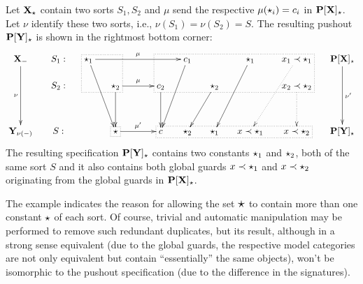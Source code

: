 \begin{example}\label{ex:sigchoice}
Let ${\bf X}_\star$ contain two sorts $S_1,S_2$ and $\mu$ send the respective
$\mu(\star_i)=c_i$ in  ${\bf P[X]_\star}$. Let $\nu$ identify these two
sorts, i.e., $\nu(S_1)=\nu(S_2)=S$. The resulting pushout ${\bf P[Y]_\star}$ is shown in the
rightmost bottom corner:
\[
\xymatrix@R=0.5cm@C=0.5cm{
\thr X_\weak  \ar[ddd]_\nu & S_1: & {\cons_1} \save[].[dr]*\frm{.}\restore \ar[dddr] \ar[rrrr]^\mu && &&
           c_1 \ar[dddl] & & \cons_1 \ar[dddl]  & x_1\prec
           \cons_1  \ar@{.>}[dddl] & \thr{P[X]_\cons} \ar[ddd]^{\nu'} \\
 & S_2: & & \cons_2 \ar[rr]^\mu \ar[dd]  && c_2 \save[].[urrrr]*\frm{.}\restore 
               \ar[dd] & & \cons_2 \ar[ddl] &  & x_2\prec
           \cons_2  \ar@{.>}[dd]\\ 
& & &&&&&&  \\
\thr{Y_{\nu(\weak)}} & S: & & \cons \save[].[]*\frm{.}\restore \ar[rr]^{\mu'} && 
    c \save[].[rrrr]*\frm{.}\restore & \cons_2 & \cons_1 &   x\prec \cons_1 &
    x\prec \cons_2 & \thr{P[Y]_\cons}
}
\]
The resulting specification  ${\bf P[Y]_\star}$ contains two constants $\star_1$ and $\star_2$,
both of the same sort $S$ and it also contains both global guards $x\prec
\star_1$ and $x\prec \star_2$ originating from the global guards in
${\bf P[X]_\star}$.
\end{example}
%
The example indicates the reason for allowing the set $\mbox{\Large{$\star$}}$ to contain more
than one constant $\star$
of each sort. Of course, trivial and automatic manipulation may be performed
to remove such redundant duplicates, but its result, although in a strong
sense equivalent (due to the global guards, the respective model categories
are not only equivalent but contain ``essentially'' the same objects), won't be isomorphic to the
pushout specification (due to the difference
in the signatures).
%
